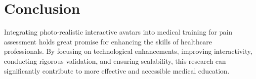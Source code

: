 \documentclass[a4paper,twocolumn]{article}
\begin{document}
\section{Conclusion}

Integrating photo-realistic interactive avatars into medical training for pain assessment holds great promise for enhancing the skills of healthcare professionals. By focusing on technological enhancements, improving interactivity, conducting rigorous validation, and ensuring scalability, this research can significantly contribute to more effective and accessible medical education.









\normalsize
\end{document}
